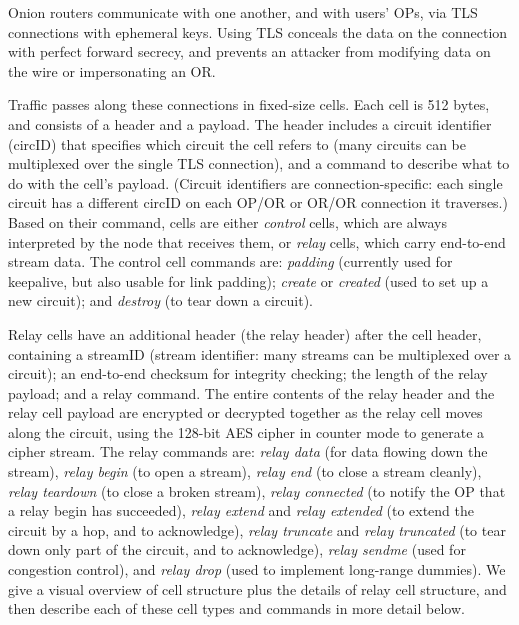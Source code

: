 \documentclass[twocolumn]{article}
\begin{document}
Onion routers communicate with one another, and with users' OPs, via
TLS connections with ephemeral keys.  Using TLS conceals the data on
the connection with perfect forward secrecy, and prevents an attacker
from modifying data on the wire or impersonating an OR.

Traffic passes along these connections in fixed-size cells.  Each cell
is 512 bytes, %
and consists of a header and a payload. The header includes a circuit
identifier (circID) that specifies which circuit the cell refers to
(many circuits can be multiplexed over the single TLS connection), and
a command to describe what to do with the cell's payload.  (Circuit
identifiers are connection-specific: each single circuit has a different
circID on each OP/OR or OR/OR connection it traverses.)
Based on their command, cells are either \emph{control} cells, which are
always interpreted by the node that receives them, or \emph{relay} cells,
which carry end-to-end stream data.   The control cell commands are:
\emph{padding} (currently used for keepalive, but also usable for link
padding); \emph{create} or \emph{created} (used to set up a new circuit);
and \emph{destroy} (to tear down a circuit).

Relay cells have an additional header (the relay header) after the
cell header, containing a streamID (stream identifier: many streams can
be multiplexed over a circuit); an end-to-end checksum for integrity
checking; the length of the relay payload; and a relay command.
The entire contents of the relay header and the relay cell payload
are encrypted or decrypted together as the relay cell moves along the
circuit, using the 128-bit AES cipher in counter mode to generate a
cipher stream.  The relay commands are: \emph{relay
data} (for data flowing down the stream), \emph{relay begin} (to open a
stream), \emph{relay end} (to close a stream cleanly), \emph{relay
teardown} (to close a broken stream), \emph{relay connected}
(to notify the OP that a relay begin has succeeded), \emph{relay
extend} and \emph{relay extended} (to extend the circuit by a hop,
and to acknowledge), \emph{relay truncate} and \emph{relay truncated}
(to tear down only part of the circuit, and to acknowledge), \emph{relay
sendme} (used for congestion control), and \emph{relay drop} (used to
implement long-range dummies).
We give a visual overview of cell structure plus the details of relay
cell structure, and then describe each of these cell types and commands
in more detail below.
\end{document}
